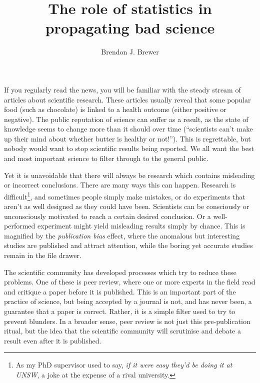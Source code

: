 \documentclass[a4paper, 12pt]{article}
\title{The role of statistics in propagating bad science}
\author{Brendon J. Brewer}
\begin{document}
\sffamily
\maketitle

If you regularly read the news, you will be familiar with the steady stream of
articles about scientific research. These articles usually reveal that some
popular food (such as chocolate)
is linked to a health outcome (either positive or negative).
The public reputation of science can suffer as
a result, as the state of knowledge seems to change more than it should
over time (``scientists can't make up their mind about whether butter is
healthy or not!''). This is regrettable,
but nobody would want to stop scientific results being reported. We all want
the best and most important science to filter through to the general public.

Yet it is unavoidable that there will always be
research which contains misleading or incorrect conclusions.
There are many ways this can happen. Research is difficult\footnote{As my
PhD supervisor used to say, {\em if it were easy they'd be doing it at UNSW},
a joke at the expense of a rival university.}, and sometimes
people simply make mistakes, or do experiments that aren't as well designed as
they could have been.
Scientists can be consciously or
unconsciously motivated to reach a certain desired conclusion.
Or a well-performed experiment might yield
misleading results simply by chance. This is magnified by the
{\em publication bias} effect, where the anomalous but interesting studies
are published and attract attention, while the boring yet accurate studies
remain in the file drawer.

The scientific community has developed processes which try to reduce these
problems. One of these is peer review, where one or more experts in the field
read and critique a paper before it is published.
This is an important part of the practice of
science, but being accepted by a journal
is not, and has never been, a guarantee that a paper is correct. Rather, it
is a simple filter used to try to prevent blunders.
In a broader sense, peer review is not just this pre-publication ritual, but
the idea that the scientific community will scrutinise and debate a result
even after it is published.
\end{document}
